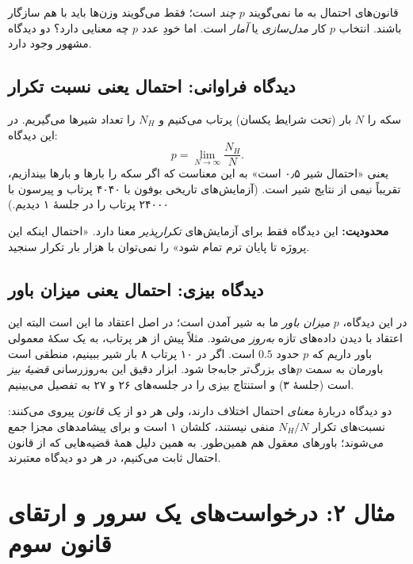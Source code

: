 \begin{note}
قانون‌های احتمال به ما نمی‌گویند $p$ \emph{چند} است؛ فقط می‌گویند وزن‌ها باید با هم سازگار باشند. انتخاب $p$ کار \emph{مدل‌سازی} یا \emph{آمار} است. اما خودِ عدد $p$ چه معنایی دارد؟ دو دیدگاه مشهور وجود دارد.
\end{note}

\subsection{دیدگاه فراوانی: احتمال یعنی نسبت تکرار}

سکه را $N$ بار (تحت شرایط یکسان) پرتاب می‌کنیم و $N_H$ را تعداد شیرها می‌گیریم. در این دیدگاه:
\[ p=\lim_{N\to\infty}\frac{N_H}{N}. \]
یعنی «احتمال شیر ۰٫۵ است» به این معناست که اگر سکه را بارها و بارها بیندازیم، تقریباً نیمی از نتایج شیر است. (آزمایش‌های تاریخی بوفون با ۴۰۴۰ پرتاب و پیرسون با ۲۴۰۰۰ پرتاب را در جلسهٔ ۱ دیدیم.)

\textbf{محدودیت:} این دیدگاه فقط برای آزمایش‌های \emph{تکرارپذیر} معنا دارد. «احتمال اینکه این پروژه تا پایان ترم تمام شود» را نمی‌توان با هزار بار تکرار سنجید.

\subsection{دیدگاه بیزی: احتمال یعنی میزان باور}

در این دیدگاه، $p$ \emph{میزان باور} ما به شیر آمدن است؛ در اصل اعتقاد ما این است البته  این اعتقاد با دیدن داده‌های تازه \emph{به‌روز} می‌شود. مثلاً پیش از هر پرتاب، به یک سکهٔ معمولی باور داریم که $p$ حدود $0.5$ است. اگر در ۱۰ پرتاب ۸ بار شیر ببینیم، منطقی است باورمان به سمت $p$های بزرگ‌تر جابه‌جا شود. ابزار دقیق این به‌روزرسانی \emph{قضیهٔ بیز} است (جلسهٔ ۳) و استنتاج بیزی را در جلسه‌های ۲۶ و ۲۷ به تفصیل می‌بینیم.

\begin{intuition}
دو دیدگاه دربارهٔ \emph{معنای} احتمال اختلاف دارند، ولی هر دو از \emph{یک قانون} پیروی می‌کنند: نسبت‌های تکرار $N_H/N$ منفی نیستند، کلشان ۱ است و برای پیشامدهای مجزا جمع می‌شوند؛ باورهای معقول هم همین‌طور. به همین دلیل همهٔ قضیه‌هایی که از قانون احتمال ثابت می‌کنیم، در هر دو دیدگاه معتبرند.
\end{intuition}

\section{مثال ۲: درخواست‌های یک سرور و ارتقای قانون سوم}

